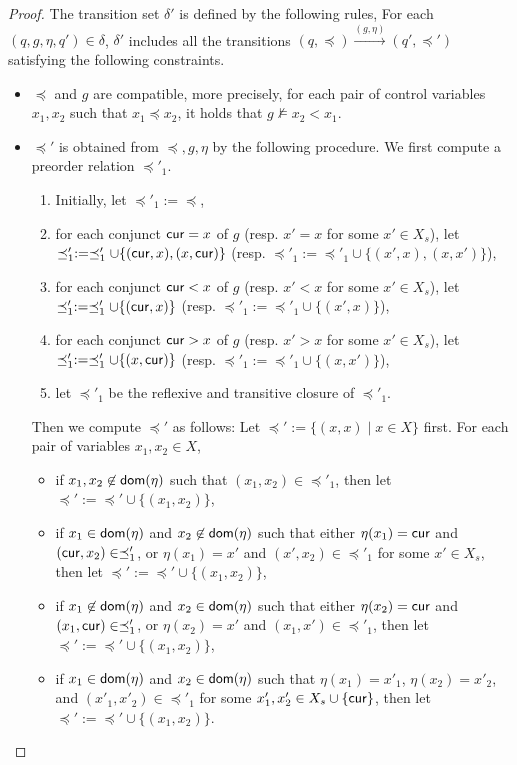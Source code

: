 \begin{appendix}
\begin{proof}
The transition set $\delta'$ is defined by the following rules, 
For each $(q, g, \eta, q') \in \delta$, $\delta'$ includes all the transitions $(q, \preceq) \xrightarrow{(g,\eta)} (q', \preceq')$ satisfying the following constraints. 
\begin{itemize}
\item $\preceq$ and $g$ are compatible, more precisely,  for each pair of control variables $x_1, x_2$ such that $x_1 \preceq x_2$, it holds that  $g \not \models x_2 < x_1$.
%
\item $\preceq'$ is obtained from $\preceq,g,\eta$ by the following procedure. We first compute a preorder relation $\preceq'_1$. 
\begin{enumerate}
\item Initially, let $\preceq'_1 :=\preceq$,

\item for each conjunct $\mathsf{cur} = x$ of $g$ (resp. $x' = x$ for some $x' \in X_s$), let $\preceq'_1 := \preceq'_1 \cup \{(\mathsf{cur}, x), (x, \mathsf{cur})\}$ (resp. $\preceq'_1 := \preceq'_1 \cup \{(x', x), (x, x')\}$), 

\item for each conjunct $\mathsf{cur} < x$ of $g$ (resp. $x' < x$ for some $x' \in X_s$), let $\preceq'_1 := \preceq'_1 \cup \{(\mathsf{cur}, x)\}$ (resp. $\preceq'_1 := \preceq'_1 \cup \{(x', x)\}$), 

\item for each conjunct $\mathsf{cur} > x$ of $g$ (resp. $x' > x$ for some $x' \in X_s$), let  $\preceq'_1 := \preceq'_1 \cup \{(x, \mathsf{cur})\}$ (resp. $\preceq'_1 := \preceq'_1 \cup \{(x,x')\}$),

\item let $\preceq'_1$ be the reflexive and transitive closure of $\preceq'_1$.
\end{enumerate}
Then we compute $\preceq'$ as follows: Let $\preceq':=\{(x,x) \mid x \in X\}$ first. For each pair of variables $x_1, x_2 \in X$, 
\begin{itemize}
\item if $x_1, x_2 \not \in \mathsf{dom}(\eta)$ such that $(x_1, x_2) \in \preceq'_1$, then let $\preceq':= \preceq' \cup \{(x_1,x_2)\}$, 
%
\item if $x_1 \in \mathsf{dom}(\eta)$ and $x_2 \not \in \mathsf{dom}(\eta)$ such that either $\eta(x_1) = \mathsf{cur}$ and $(\mathsf{cur}, x_2) \in \preceq'_1$, or $\eta(x_1) = x'$ and $(x', x_2) \in \preceq'_1$ for some $x' \in X_s$, then let $\preceq':= \preceq' \cup \{(x_1, x_2)\}$,
%
\item if $x_1 \not \in \mathsf{dom}(\eta)$ and $x_2 \in \mathsf{dom}(\eta)$ such that either $\eta(x_2) = \mathsf{cur}$ and $(x_1, \mathsf{cur}) \in \preceq'_1$, or $\eta(x_2) = x'$ and $(x_1, x') \in \preceq'_1$, then let $\preceq':= \preceq' \cup \{(x_1, x_2)\}$,
%
\item if $x_1 \in \mathsf{dom}(\eta)$ and $x_2 \in \mathsf{dom}(\eta)$ such that $\eta(x_1) = x'_1$, $\eta(x_2) = x'_2$, and $(x'_1, x'_2) \in \preceq'_1$  for some $x'_1, x'_2 \in X_s \cup \{\mathsf{cur}\}$, then let $\preceq':= \preceq' \cup \{(x_1, x_2)\}$.
\end{itemize}
%
\end{itemize}


\end{proof}
\end{appendix}
